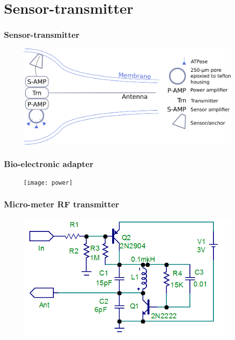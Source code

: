 \documentclass[12pt]{beamer}
\begin{document}
\section{Sensor-transmitter}

\begin{frame}
\frametitle{Sensor-transmitter}
\begin{figure}
\includegraphics[width=1.0\linewidth]{cellCircuit_transmitter}
\end{figure}
\end{frame}



\begin{frame}
\frametitle{Bio-electronic adapter}
\begin{figure}
\texttt{[image: power]}
\end{figure}
\end{frame}



\begin{frame}
\frametitle{Micro-meter RF transmitter}
\begin{figure}
\includegraphics[width=1.0\linewidth]{transmitter}
\end{figure}
\end{frame}
\end{document}
